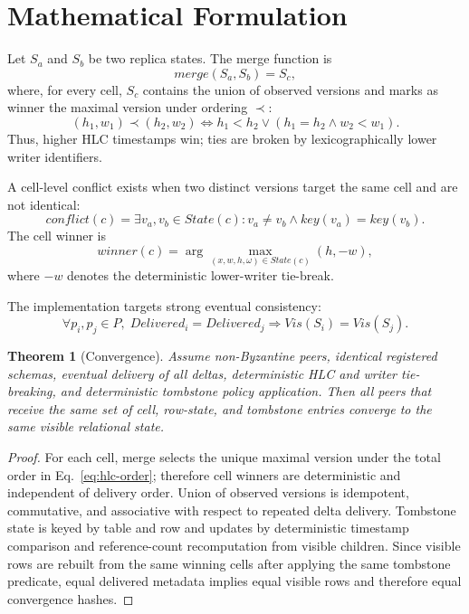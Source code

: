 \documentclass[pdflatex,sn-mathphys-num]{sn-jnl}
\newtheorem{theorem}{Theorem}
\begin{document}
\section{Mathematical Formulation}
\label{sec:math}

Let $S_a$ and $S_b$ be two replica states. The merge function is
\begin{equation}
merge(S_a,S_b)=S_c,
\label{eq:merge-function}
\end{equation}
where, for every cell, $S_c$ contains the union of observed versions and marks as winner the maximal version under ordering $\prec$:
\begin{equation}
(h_1,w_1)\prec(h_2,w_2)\Leftrightarrow h_1<h_2 \lor (h_1=h_2\land w_2<w_1).
\label{eq:hlc-order}
\end{equation}
Thus, higher HLC timestamps win; ties are broken by lexicographically lower writer identifiers.

A cell-level conflict exists when two distinct versions target the same cell and are not identical:
\begin{equation}
conflict(c)=\exists v_a,v_b\in State(c): v_a\neq v_b \land key(v_a)=key(v_b).
\label{eq:conflict-detection}
\end{equation}
The cell winner is
\begin{equation}
winner(c)=\arg\max_{(x,w,h,\omega)\in State(c)}(h,-w),
\label{eq:winner}
\end{equation}
where $-w$ denotes the deterministic lower-writer tie-break.

The implementation targets strong eventual consistency:
\begin{equation}
\forall p_i,p_j\in P,\; Delivered_i=Delivered_j \Rightarrow Vis(S_i)=Vis(S_j).
\label{eq:sec}
\end{equation}

\begin{theorem}[Convergence]
\label{thm:convergence}
Assume non-Byzantine peers, identical registered schemas, eventual delivery of all deltas, deterministic HLC and writer tie-breaking, and deterministic tombstone policy application. Then all peers that receive the same set of cell, row-state, and tombstone entries converge to the same visible relational state.
\end{theorem}

\begin{proof}
For each cell, merge selects the unique maximal version under the total order in Eq.~\eqref{eq:hlc-order}; therefore cell winners are deterministic and independent of delivery order. Union of observed versions is idempotent, commutative, and associative with respect to repeated delta delivery. Tombstone state is keyed by table and row and updates by deterministic timestamp comparison and reference-count recomputation from visible children. Since visible rows are rebuilt from the same winning cells after applying the same tombstone predicate, equal delivered metadata implies equal visible rows and therefore equal convergence hashes.
\end{proof}
\end{document}
